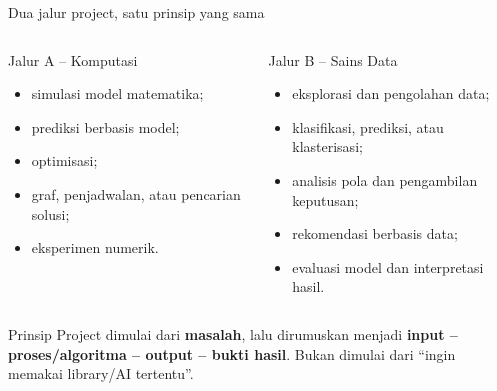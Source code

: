 \documentclass[aspectratio=169,11pt]{beamer}
\begin{document}
\begin{frame}{Dua jalur project, satu prinsip yang sama}
\begin{columns}[T]
\begin{block}{Jalur A -- Komputasi}
\small
\begin{itemize}
  \item simulasi model matematika;
  \item prediksi berbasis model;
  \item optimisasi;
  \item graf, penjadwalan, atau pencarian solusi;
  \item eksperimen numerik.
\end{itemize}
\end{block}
\begin{block}{Jalur B -- Sains Data}
\small
\begin{itemize}
  \item eksplorasi dan pengolahan data;
  \item klasifikasi, prediksi, atau klasterisasi;
  \item analisis pola dan pengambilan keputusan;
  \item rekomendasi berbasis data;
  \item evaluasi model dan interpretasi hasil.
\end{itemize}
\end{block}
\end{columns}
\vspace{2mm}
\begin{alertblock}{Prinsip}
Project dimulai dari \textbf{masalah}, lalu dirumuskan menjadi \textbf{input -- proses/algoritma -- output -- bukti hasil}. Bukan dimulai dari ``ingin memakai library/AI tertentu''.
\end{alertblock}
\end{frame}
\end{document}
